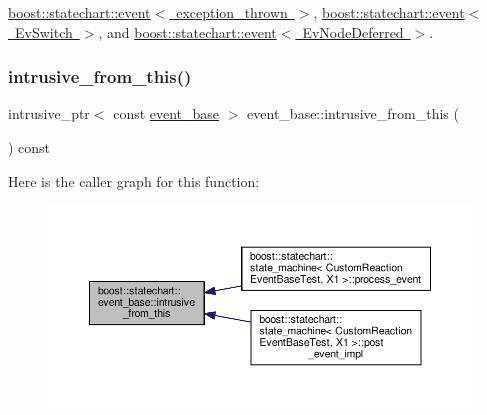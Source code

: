 \mbox{\hyperlink{classboost_1_1statechart_1_1event_ad7e8221cf71f8513075e29a64b9ad5b6}{boost\+::statechart\+::event$<$ exception\+\_\+thrown $>$}}, \mbox{\hyperlink{classboost_1_1statechart_1_1event_ad7e8221cf71f8513075e29a64b9ad5b6}{boost\+::statechart\+::event$<$ Ev\+Switch $>$}}, and \mbox{\hyperlink{classboost_1_1statechart_1_1event_ad7e8221cf71f8513075e29a64b9ad5b6}{boost\+::statechart\+::event$<$ Ev\+Node\+Deferred $>$}}.

\mbox{\label{classboost_1_1statechart_1_1event__base_a3876893500a8f7739e39dd4d924bae09}} 
\subsubsection{\texorpdfstring{intrusive\+\_\+from\+\_\+this()}{intrusive\_from\_this()}}
{\footnotesize\ttfamily intrusive\+\_\+ptr$<$ const \mbox{\hyperlink{classboost_1_1statechart_1_1event__base}{event\+\_\+base}} $>$ event\+\_\+base\+::intrusive\+\_\+from\+\_\+this (\begin{DoxyParamCaption}{ }\end{DoxyParamCaption}) const\hspace{0.3cm}{\ttfamily [inline]}}

Here is the caller graph for this function\+:
\nopagebreak
\begin{figure}[H]
\begin{center}
\leavevmode
\includegraphics[width=350pt]{classboost_1_1statechart_1_1event__base_a3876893500a8f7739e39dd4d924bae09_icgraph}
\end{center}
\end{figure}


